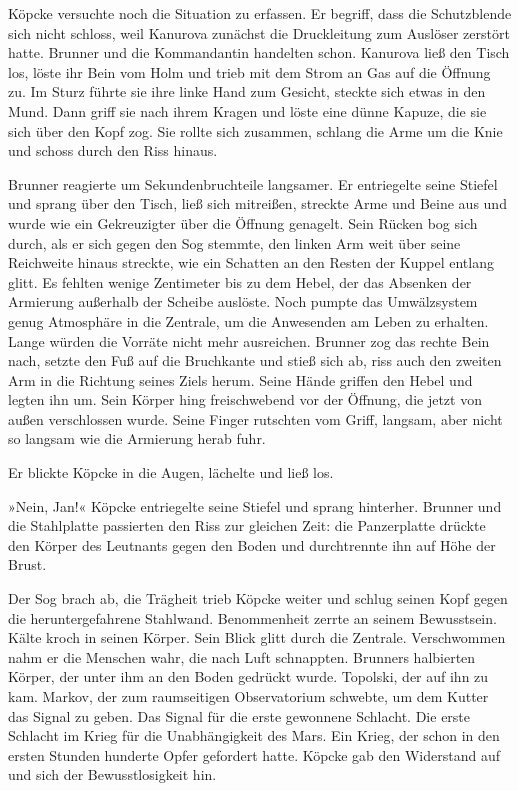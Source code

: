 Köpcke versuchte noch die Situation zu erfassen. Er begriff, dass
die Schutzblende sich nicht schloss, weil Kanurova zunächst die
Druckleitung zum Auslöser zerstört hatte. Brunner und die
Kommandantin handelten schon. Kanurova ließ den Tisch los, löste
ihr Bein vom Holm und trieb mit dem Strom an Gas auf die Öffnung
zu. Im Sturz führte sie ihre linke Hand zum Gesicht, steckte sich
etwas in den Mund. Dann griff sie nach ihrem Kragen und löste eine
dünne Kapuze, die sie sich über den Kopf zog. Sie rollte sich
zusammen, schlang die Arme um die Knie und schoss durch den Riss
hinaus.

Brunner reagierte um Sekundenbruchteile langsamer. Er entriegelte
seine Stiefel und sprang über den Tisch, ließ sich mitreißen,
streckte Arme und Beine aus und wurde wie ein Gekreuzigter über die
Öffnung genagelt. Sein Rücken bog sich durch, als er sich gegen den
Sog stemmte, den linken Arm weit über seine Reichweite hinaus
streckte, wie ein Schatten an den Resten der Kuppel entlang glitt.
Es fehlten wenige Zentimeter bis zu dem Hebel, der das Absenken der
Armierung außerhalb der Scheibe auslöste. Noch pumpte das
Umwälzsystem genug Atmosphäre in die Zentrale, um die Anwesenden am
Leben zu erhalten. Lange würden die Vorräte nicht mehr ausreichen.
Brunner zog das rechte Bein nach, setzte den Fuß auf die Bruchkante
und stieß sich ab, riss auch den zweiten Arm in die Richtung seines
Ziels herum. Seine Hände griffen den Hebel und legten ihn um. Sein
Körper hing freischwebend vor der Öffnung, die jetzt von außen
verschlossen wurde. Seine Finger rutschten vom Griff, langsam, aber
nicht so langsam wie die Armierung herab fuhr.

Er blickte Köpcke in die Augen, lächelte und ließ los.

»Nein, Jan!« Köpcke entriegelte seine Stiefel und sprang hinterher.
Brunner und die Stahlplatte passierten den Riss zur gleichen Zeit:
die Panzerplatte drückte den Körper des Leutnants gegen den Boden
und durchtrennte ihn auf Höhe der Brust.

Der Sog brach ab, die Trägheit trieb Köpcke weiter und schlug
seinen Kopf gegen die heruntergefahrene Stahlwand. Benommenheit
zerrte an seinem Bewusstsein. Kälte kroch in seinen Körper. Sein
Blick glitt durch die Zentrale. Verschwommen nahm er die Menschen
wahr, die nach Luft schnappten. Brunners halbierten Körper, der
unter ihm an den Boden gedrückt wurde. Topolski, der auf ihn zu
kam. Markov, der zum raumseitigen Observatorium schwebte, um dem
Kutter das Signal zu geben. Das Signal für die erste gewonnene
Schlacht. Die erste Schlacht im Krieg für die Unabhängigkeit des
Mars. Ein Krieg, der schon in den ersten Stunden hunderte Opfer
gefordert hatte. Köpcke gab den Widerstand auf und sich der
Bewusstlosigkeit hin.

